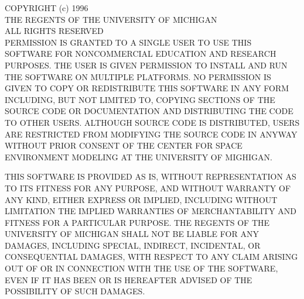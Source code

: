 \noindent COPYRIGHT (c) 1996 \\
THE REGENTS OF THE UNIVERSITY OF MICHIGAN \\
ALL RIGHTS RESERVED \\

PERMISSION IS GRANTED TO A SINGLE USER TO USE THIS SOFTWARE FOR
NONCOMMERCIAL EDUCATION AND RESEARCH PURPOSES.  THE USER IS GIVEN
PERMISSION TO INSTALL AND RUN THE SOFTWARE ON MULTIPLE PLATFORMS.  NO
PERMISSION IS GIVEN TO COPY OR REDISTRIBUTE THIS SOFTWARE IN ANY FORM
INCLUDING, BUT NOT LIMITED TO, COPYING SECTIONS OF THE SOURCE CODE OR
DOCUMENTATION AND DISTRIBUTING THE CODE TO OTHER USERS.  ALTHOUGH
SOURCE CODE IS DISTRIBUTED, USERS ARE RESTRICTED FROM MODIFYING THE
SOURCE CODE IN ANYWAY WITHOUT PRIOR CONSENT OF THE CENTER FOR SPACE
ENVIRONMENT MODELING AT THE UNIVERSITY OF MIGHIGAN.

THIS SOFTWARE IS PROVIDED AS IS, WITHOUT REPRESENTATION AS TO ITS
FITNESS FOR ANY PURPOSE, AND WITHOUT WARRANTY OF ANY KIND, EITHER
EXPRESS OR IMPLIED, INCLUDING WITHOUT LIMITATION THE IMPLIED WARRANTIES
OF MERCHANTABILITY AND FITNESS FOR A PARTICULAR PURPOSE. THE REGENTS OF
THE UNIVERSITY OF MICHIGAN SHALL NOT BE LIABLE FOR ANY DAMAGES,
INCLUDING SPECIAL, INDIRECT, INCIDENTAL, OR CONSEQUENTIAL DAMAGES, WITH
RESPECT TO ANY CLAIM ARISING OUT OF OR IN CONNECTION WITH THE USE OF
THE SOFTWARE, EVEN IF IT HAS BEEN OR IS HEREAFTER ADVISED OF THE
POSSIBILITY OF SUCH DAMAGES.



